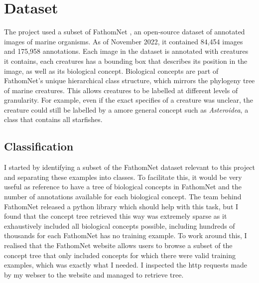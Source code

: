 \documentclass[12pt,a4paper,twoside,openany]{report}
\begin{document}
\section{Dataset}
The project used a subset of FathomNet \cite{katija_fathomnet_2022}, an open-source dataset of annotated images of marine organisms. As of November 2022, it contained 84,454 images and 175,958 annotations. Each image in the dataset is annotated with creatures it contains, each creatures has a bounding box that describes its position in the image, as well as its biological concept. Biological concepts are part of FathomNet's unique hierarchical class structure, which mirrors the phylogeny tree of marine creatures. This allows creatures to be labelled at different levels of granularity. For example, even if the exact specifies of a creature was unclear, the creature could still be labelled by a amore general concept such as \textit{Asteroidea}, a class that contains all starfishes.

\subsection{Classification}
I started by identifying a subset of the FathomNet dataset relevant to this project and separating these examples into classes. To facilitate this, it would be very useful as reference to have a tree of biological concepts in FathomNet and the number of annotations available for each biological concept. The team behind FathomNet released a python library which should help with this task, but I found that the concept tree retrieved this way was extremely sparse as it exhaustively included all biological concepts possible, including hundreds of thousands for each FathomNet has no training example. To work around this, I realised that the FathomNet website allows users to browse a subset of the concept tree that only included concepts for which there were valid training examples, which was exactly what I needed. I inspected the http requests made by my webser to the website and managed to retrieve tree.
\end{document}
